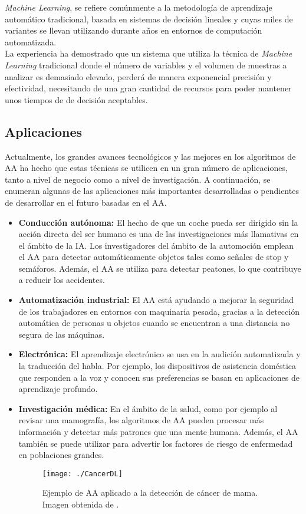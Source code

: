 \documentclass[a4paper, 12pt, spanish, chapterprefix, numbers=noenddot]{book}
\begin{document}
\textit{Machine Learning}, se refiere comúnmente a la metodología de aprendizaje automático tradicional, basada en sistemas de decisión lineales y cuyas miles de variantes se llevan utilizando durante años en entornos de computación automatizada.\\

La experiencia ha demostrado que un sistema que utiliza la técnica de \textit{Machine Learning} tradicional donde el número de variables y el volumen de muestras a analizar es demasiado elevado, perderá de manera exponencial precisión y efectividad, necesitando de una gran cantidad de recursos para poder mantener unos tiempos de de decisión aceptables.

\subsection{Aplicaciones}

Actualmente, los grandes avances tecnológicos y las mejores en los algoritmos de AA ha hecho que estas técnicas se utilicen en un gran número de aplicaciones, tanto a nivel de negocio como a nivel de investigación. A continuación, se enumeran algunas de las aplicaciones más importantes desarrolladas o pendientes de desarrollar en el futuro basadas en el AA.

\begin{itemize}
\item \textbf{Conducción autónoma:} El hecho de que un coche pueda ser dirigido sin la acción directa del ser humano es una de las investigaciones más llamativas en el ámbito de la IA. Los investigadores del ámbito de la automoción emplean el AA para detectar automáticamente objetos tales como señales de stop y semáforos. Además, el AA se utiliza para detectar peatones, lo que contribuye a reducir los accidentes.
\item \textbf{Automatización industrial:} El AA está ayudando a mejorar la seguridad de los trabajadores en entornos con maquinaria pesada, gracias a la detección automática de personas u objetos cuando se encuentran a una distancia no segura de las máquinas.
\item \textbf{Electrónica:} El aprendizaje electrónico se usa en la audición automatizada y la traducción del habla. Por ejemplo, los dispositivos de asistencia doméstica que responden a la voz y conocen sus preferencias se basan en aplicaciones de aprendizaje profundo.
\item \textbf{Investigación médica:} En el ámbito de la salud, como por ejemplo al revisar una mamografía, los algoritmos de AA pueden procesar más información y detectar más patrones que una mente humana. Además, el AA también se puede utilizar para advertir los factores de riesgo de enfermedad en poblaciones grandes.
\begin{figure}[H]
\begin{center}
\texttt{[image: ./CancerDL]}
\caption{Ejemplo de AA aplicado a la detección de cáncer de mama. Imagen obtenida de \cite{CancerMamaDeepLearning}.}
\label{MArcoIA}
\end{center}
\end{figure}
\end{itemize}
\end{document}
